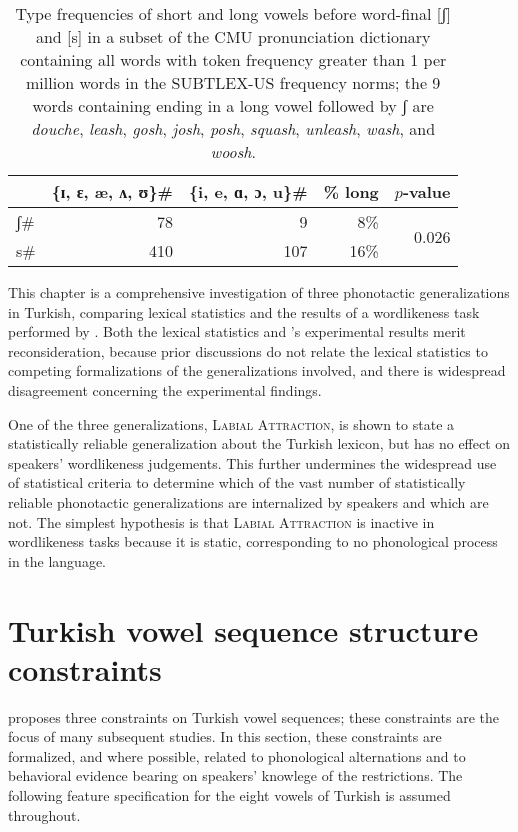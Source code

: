 \begin{table}
\centering
\begin{tabular}{l r r r r}
\toprule
          & \{ɪ, ɛ, æ, ʌ, ʊ\}\gap{}\# & \{i, e, ɑ, ɔ, u\}\gap{}\# & \% long & $p$-value \\
\midrule
\gap{}ʃ\# & 78                & 9                 & 8\%      & \multirow{2}{*}{0.026} \\
\gap{}s\# & 410               & 107               & 16\%     & \\
\bottomrule
\end{tabular}
\caption{Type frequencies of short and long vowels before word-final [ʃ] and [s] in a subset of the CMU pronunciation dictionary containing all words with token frequency greater than 1 per million words in the SUBTLEX-US frequency norms; the 9 words containing ending in a long vowel followed by ʃ are \emph{douche}, \emph{leash}, \emph{gosh}, \emph{josh}, \emph{posh}, \emph{squash}, \emph{unleash}, \emph{wash}, and \emph{woosh}.}
\label{ssh}
\end{table}

This chapter is a comprehensive investigation of three phonotactic generalizations in Turkish, comparing lexical statistics and the results of a wordlikeness task performed by \citet{Zimmer1969}. Both the lexical statistics and \citeauthor{Zimmer1969}'s experimental results merit reconsideration, because prior discussions do not relate the lexical statistics to competing formalizations of the generalizations involved, and there is widespread disagreement concerning the experimental findings.

One of the three generalizations, \textsc{Labial Attraction}, is shown to   state a statistically reliable generalization about the Turkish lexicon, but has no effect on speakers' wordlikeness judgements. This further undermines the widespread use of statistical criteria to determine which of the vast number of statistically reliable phonotactic generalizations are internalized by speakers and which are not. The simplest hypothesis is that \textsc{Labial Attraction} is inactive in wordlikeness tasks because it is static, corresponding to no phonological process in the language.

\section{Turkish vowel sequence structure constraints}

\citet{Lees1966b,Lees1966a} proposes three constraints on Turkish vowel sequences; these constraints are the focus of many subsequent studies. In this section, these constraints are formalized, and where possible, related to phonological alternations and to behavioral evidence bearing on speakers' knowlege of the restrictions. The following feature specification for the eight vowels of Turkish is assumed throughout.

